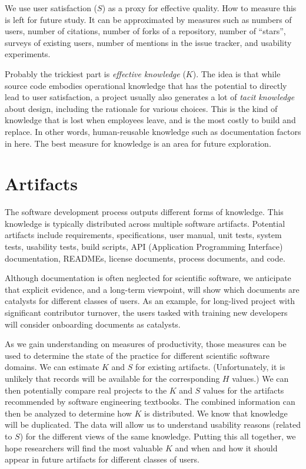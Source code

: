 \documentclass[sigconf, authorversion, nonacm]{acmart}
\begin{document}
We use user satisfaction ($S$) as a proxy for effective quality. How to 
measure this is left for future study. It can be approximated by measures
such as numbers of users, number of citations, number
of forks of a repository, number of ``stars'', surveys of existing users,
number of mentions in the issue tracker, and usability experiments.

Probably the trickiest part is \emph{effective knowledge} ($K$). The idea
is that while source code embodies operational knowledge that has the
potential to directly lead to user satisfaction, a project usually also
generates a lot of \emph{tacit knowledge} about design, including the
rationale for various choices. This is the kind of knowledge that is lost
when employees leave, and is the most costly to build and replace.
In other words, human-reusable knowledge such as documentation factors in
here.  The best measure for knowledge is an area for future exploration.

\section{Artifacts}

The software development process outputs different forms of knowledge. This
knowledge is typically distributed across multiple software artifacts.
Potential artifacts include requirements, specifications, user manual, unit
tests, system tests, usability tests, build scripts, API (Application
Programming Interface) documentation, READMEs, license documents, process
documents, and code.

Although documentation is often neglected for scientific software, we anticipate
that explicit evidence, and a long-term viewpoint, will show which documents are
catalysts for different classes of users.  As an example, for long-lived project
with significant contributor turnover, the users tasked with training new
developers will consider onboarding documents as catalysts.

As we gain understanding on measures of productivity, those measures can be used
to determine the state of the practice for different scientific software
domains. We can estimate $K$ and $S$ for existing artifacts. (Unfortunately, it
is unlikely that records will be available for the corresponding $H$ values.) We
can then potentially compare real projects to the $K$ and $S$ values for the
artifacts recommended by software engineering textbooks.  The combined
information can then be analyzed to determine how $K$ is distributed.  We know
that knowledge will be duplicated.  The data will allow us to understand
usability reasons (related to $S$) for the different views of the same
knowledge.  Putting this all together, we hope researchers will find the most
valuable $K$ and when and how it should appear in future artifacts for different
classes of users.
\end{document}
